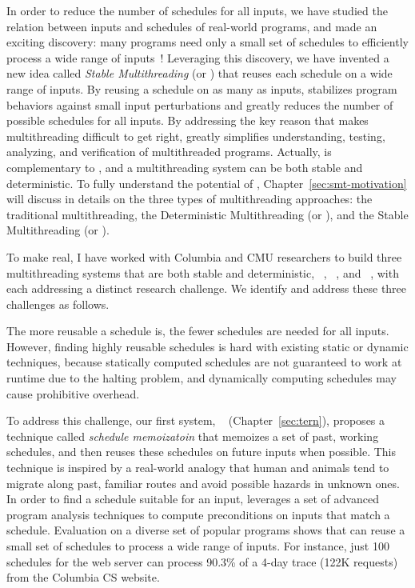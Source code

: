In order to reduce the number of schedules for all inputs, we have studied the
relation between inputs and schedules of real-world programs, and made an
exciting discovery: many programs need only a small set of schedules to
efficiently process a wide range of inputs~\cite{smt:cacm}! Leveraging this
discovery, we have invented a new idea called \emph{Stable Multithreading} (or 
\emph{\smt}) that reuses each schedule on a wide range of inputs. By reusing a 
schedule on as many as inputs, \smt stabilizes program behaviors against small 
input perturbations and greatly reduces the number of possible schedules for all
inputs. By addressing the key reason that makes multithreading difficult to get
right, \smt greatly simplifies understanding, testing, analyzing,
and verification of multithreaded programs. Actually, \smt is
complementary to \dmt, and a multithreading system can be both stable and 
deterministic. To fully understand the potential of \smt, 
Chapter~\ref{sec:smt-motivation} will discuss in details on the three types of 
multithreading approaches: the traditional multithreading, the Deterministic 
Multithreading (or \dmt), and the Stable Multithreading (or \smt).


To make \smt real, I have worked with Columbia and CMU researchers to build
three multithreading systems that are both stable and deterministic, 
\tern~\cite{cui:tern:osdi10}, \peregrine~\cite{peregrine:sosp11}, and 
\parrot~\cite{parrot:sosp13}, with each addressing a distinct research 
challenge. We identify and address these three challenges as follows.

 The more reusable a schedule is, the fewer schedules are needed for 
all inputs.
However, finding highly reusable schedules is hard with existing static or
dynamic techniques, because statically computed schedules are not guaranteed to
work at runtime due to the halting problem, and dynamically computing schedules
may cause prohibitive overhead.

To address this challenge, our first \smt system, 
\tern~\cite{cui:tern:osdi10} (Chapter~\ref{sec:tern}), proposes a technique 
called \emph{schedule memoizatoin} that memoizes a set of past, working 
schedules, and then reuses these schedules on future inputs when possible. This 
technique is inspired by a real-world analogy that human and animals tend to 
migrate along past, familiar routes and avoid possible hazards in unknown ones. 
In order to find a schedule suitable for an input, \tern leverages a set of 
advanced program analysis techniques to compute preconditions on inputs that 
match a schedule. Evaluation on a diverse set of popular programs shows that 
\tern can reuse a small set of schedules to process a wide range of inputs. For 
instance, just 100 schedules for the \apache web server can process 90.3\% of a 
4-day trace (122K requests) from the Columbia CS website.

